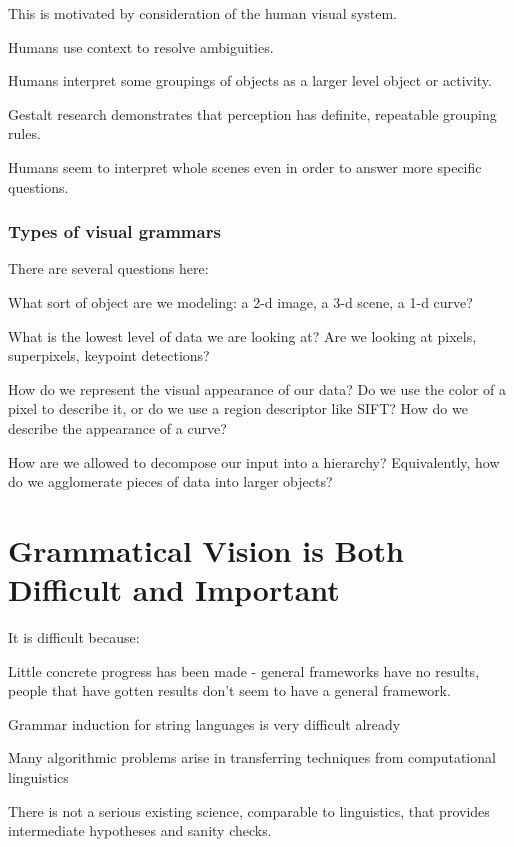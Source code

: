 \documentclass{article}
\begin{document}
This is motivated by consideration of the human visual system.
\bitem
\item Humans use context to resolve ambiguities.
\item Humans interpret some groupings of objects as a larger level object or activity.
\item Gestalt research demonstrates that perception has definite, repeatable grouping rules.
\item Humans seem to interpret whole scenes even in order to answer more specific questions.
\eitem

\subsubsection{Types of visual grammars}

There are several questions here:
\bitem
\item What sort of object are we modeling: a 2-d image, a 3-d scene, a 1-d curve?
\item What is the lowest level of data we are looking at? Are we looking at
  pixels, superpixels, keypoint detections? 
\item How do we represent the visual appearance of our data? Do we use
  the color of a pixel to describe it, or do we use a region
  descriptor like SIFT? How do we describe the appearance of a curve?
\item How are we allowed to decompose our input into a hierarchy?
  Equivalently, how do we agglomerate pieces of data into larger objects?
\eitem

\section{Grammatical Vision is Both Difficult and Important}

It is difficult because:
\bitem
\item Little concrete progress has been made - general frameworks have
  no results, people that have gotten results don't seem to have a
  general framework.
\item Grammar induction for string languages is very difficult already
\item Many algorithmic problems arise in transferring techniques from
  computational linguistics
\item There is not a serious existing science, comparable to
  linguistics, that provides intermediate hypotheses and sanity
  checks.  

\eitem
\end{document}
